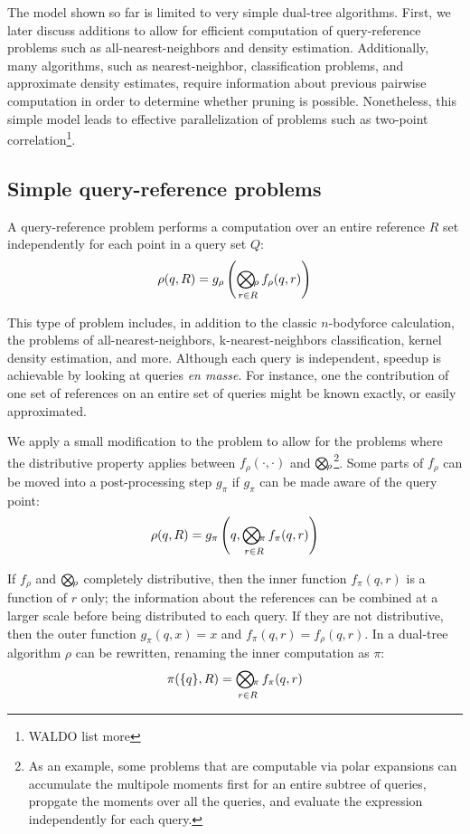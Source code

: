 \documentclass[times, 10pt,twocolumn]{article}
\newcommand{\nbody}{$n$-body}
\newcommand{\myOp}[1]{\mathop{\bigotimes\nolimits\hspace{-0.045in}_{#1}}}
\newcommand{\allpi}{\pi}
\newcommand{\Oppi}{\myOp{\pi}}
\newcommand{\fpi}{f_{\pi}}
\newcommand{\gpi}{g_{\pi}}
\newcommand{\allrho}{\rho}
\newcommand{\Oprho}{\myOp{\rho}}
\newcommand{\frho}{f_{\rho}}
\newcommand{\grho}{g_{\rho}}
\begin{document}
The model shown so far is limited to very simple dual-tree algorithms.
First, we later discuss additions to allow for efficient computation of query-reference problems such as all-nearest-neighbors and density estimation.
Additionally, many algorithms, such as nearest-neighbor, classification problems, and approximate density estimates, require information about previous pairwise computation in order to determine whether pruning is possible.
Nonetheless, this simple model leads to effective parallelization of problems such as two-point correlation\footnote{WALDO list more}.

\subsection{Simple query-reference problems}

A query-reference problem performs a computation over an entire reference $R$ set independently for each point in a query set $Q$:
\begin{equation}
\allrho(q, R) = \grho \left( \Oprho_{r \in R} \frho (q, r) \right)
\end{equation}

\noindent This type of problem includes, in addition to the classic \nbody force calculation, the problems of all-nearest-neighbors, k-nearest-neighbors classification, kernel density estimation, and more.
Although each query is independent, speedup is achievable by looking at queries {\it en masse}.
For instance, one the contribution of one set of references on an entire set of queries might be known exactly, or easily approximated.

We apply a small modification to the problem to allow for the problems where the distributive property applies between $\frho(\cdot, \cdot)$ and $\Oprho$\footnote{As an example, some problems that are computable via polar expansions can accumulate the multipole moments first for an entire subtree of queries, propgate the moments over all the queries, and evaluate the expression independently for each query.}.
Some parts of $\frho$ can be moved into a post-processing step $\gpi$ if $\gpi$ can be made aware of the query point:
\begin{equation}
\allrho(q, R) = \gpi \left(q, \Oppi_{r \in R} \fpi(q, r) \right)
\end{equation}

\noindent If $\frho$ and $\Oprho$ completely distributive, then the inner function $\fpi(q, r)$ is a function of $r$ only; the information about the references can be combined at a larger scale before being distributed to each query.
If they are not distributive, then the outer function $\gpi(q, x) = x$ and $\fpi(q, r) = \frho(q, r)$.
In a dual-tree algorithm $\allrho$ can be rewritten, renaming the inner computation as $\allpi$:
\begin{equation}
\allpi(\{q\}, R) = \Oppi_{r \in R} \fpi(q, r)
\label{eqn:defpi}
\end{equation}
\end{document}
